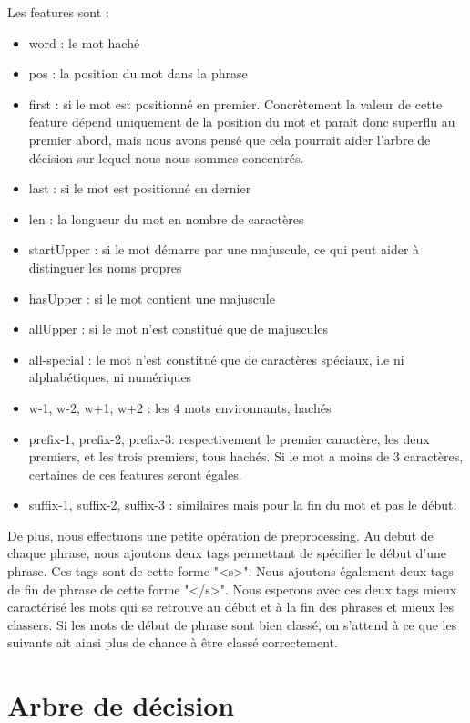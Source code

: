 \documentclass[french, 14pt]{memoir}
\begin{document}
Les features sont :
\begin{itemize}
	\item word : le mot haché
	\item pos : la position du mot dans la phrase
	\item first : si le mot est positionné en premier. Concrètement la valeur de cette feature dépend uniquement de la position du mot et paraît donc superflu au premier abord, mais nous avons pensé que cela pourrait aider l'arbre de décision sur lequel nous nous sommes concentrés.
	\item last : si le mot est positionné en dernier
	\item len : la longueur du mot en nombre de caractères
	\item startUpper : si le mot démarre par une majuscule, ce qui peut aider à distinguer les noms propres
	\item hasUpper : si le mot contient une majuscule
	\item allUpper : si le mot n'est constitué que de majuscules
	\item all-special : le mot n'est constitué que de caractères spéciaux, i.e ni alphabétiques, ni numériques
	\item w-1, w-2, w+1, w+2 : les 4 mots environnants, hachés
	\item prefix-1, prefix-2, prefix-3: respectivement le premier caractère, les deux premiers, et les trois premiers, tous hachés. Si le mot a moins de 3 caractères, certaines de ces features seront égales.
	\item suffix-1, suffix-2, suffix-3 : similaires mais pour la fin du mot et pas le début.
\end{itemize}

De plus, nous effectuons une petite opération de preprocessing. Au debut de chaque phrase, nous ajoutons deux tags permettant de spécifier le début d'une phrase. Ces tags sont de cette forme "<s>". Nous ajoutons également deux tags de fin de phrase de cette forme "</s>". Nous esperons avec ces deux tags mieux caractérisé les mots qui se retrouve au début et à la fin des phrases et mieux les classers. Si les mots de début de phrase sont bien classé, on s'attend à ce que les suivants ait ainsi plus de chance à être classé correctement. 

\section{Arbre de décision}
\end{document}
